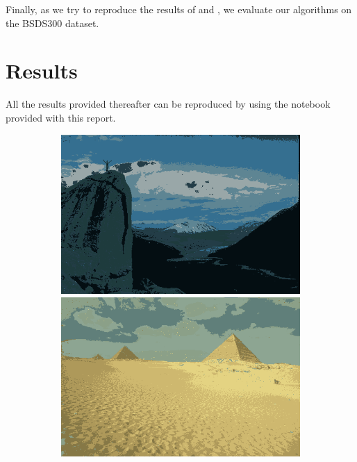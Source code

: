 \documentclass[11pt,a4paper]{article}
\begin{document}
Finally, as we try to reproduce the results of \cite{bulo-thesis} and \cite{game-clustering}, we evaluate our algorithms on the BSDS300 dataset\cite{bsds300}.

\section{Results}
\label{sec:results}

All the results provided thereafter can be reproduced by using the notebook provided with this report.

\begin{figure}
    \centering
    \begin{subfigure}[b]{0.3\textwidth}
        \centering
        \includegraphics[width=\textwidth]{figures/methods/fp/14037_avg.png}
        \includegraphics[width=\textwidth]{figures/methods/fp/260058_avg.png}

\end{subfigure}
\end{figure}
\end{document}
